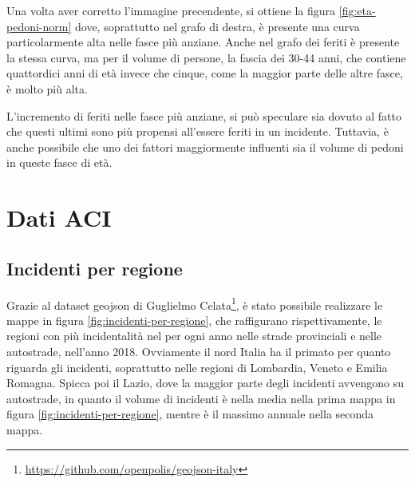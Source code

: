\documentclass[a4paper]{report}
\begin{document}
Una volta aver corretto l'immagine precendente, si ottiene la figura \ref{fig:eta-pedoni-norm} dove, 
soprattutto nel grafo di destra, è presente una curva particolarmente alta nelle fasce più anziane.
Anche nel grafo dei feriti è presente la stessa curva, ma per il volume di persone, la fascia 
dei 30-44 anni, che contiene quattordici anni di età invece che cinque, come 
la maggior parte delle altre fasce, è molto più alta.

L'incremento di feriti nelle fasce più anziane, si può speculare sia dovuto al fatto che 
questi ultimi sono più propensi all'essere feriti in un incidente. 
Tuttavia, è anche possibile che uno dei fattori maggiormente influenti sia il volume di 
pedoni in queste fasce di età.

\section{Dati ACI}


\subsection{Incidenti per regione}

Grazie al dataset geojson di Guglielmo Celata\footnote{\url{https://github.com/openpolis/geojson-italy}}, 
è stato possibile realizzare le mappe in figura \ref{fig:incidenti-per-regione}, 
che raffigurano rispettivamente, le regioni con più incidentalità nel per ogni anno nelle 
strade provinciali e nelle autostrade, nell'anno 2018.
Ovviamente il nord Italia ha il primato per quanto riguarda gli incidenti, soprattutto nelle regioni 
di Lombardia, Veneto e Emilia Romagna. 
Spicca poi il Lazio, dove la maggior parte degli incidenti avvengono su autostrade, in quanto il volume 
di incidenti è nella media nella prima mappa in figura \ref{fig:incidenti-per-regione}, mentre è il massimo annuale nella 
seconda mappa.
\end{document}
